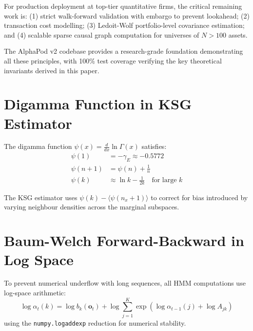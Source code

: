 \documentclass[12pt,a4paper]{article}
\newcommand{\bm}[1]{\boldsymbol{#1}}
\begin{document}
For production deployment at top-tier quantitative firms, the critical remaining
work is: (1) strict walk-forward validation with embargo to prevent lookahead;
(2) transaction cost modelling; (3) Ledoit-Wolf portfolio-level covariance
estimation; and (4) scalable sparse causal graph computation for universes of
$N > 100$ assets.

The AlphaPod v2 codebase provides a research-grade foundation demonstrating all
these principles, with 100\% test coverage verifying the key theoretical
invariants derived in this paper.




\appendix

\section{Digamma Function in KSG Estimator}

The digamma function $\psi(x) = \frac{d}{dx}\ln\Gamma(x)$ satisfies:
\begin{align}
    \psi(1) &= -\gamma_E \approx -0.5772 \\
    \psi(n+1) &= \psi(n) + \frac{1}{n} \\
    \psi(k) &\approx \ln k - \frac{1}{2k} \quad \text{for large } k
\end{align}

The KSG estimator uses $\psi(k) - \langle \psi(n_x+1) \rangle$ to
correct for bias introduced by varying neighbour densities across the marginal
subspaces.

\section{Baum-Welch Forward-Backward in Log Space}

To prevent numerical underflow with long sequences, all HMM computations use
log-space arithmetic:
\begin{equation}
    \log \alpha_t(k) = \log b_k(\bm{o}_t) + \log\!\sum_{j=1}^K \exp\!\left(\log \alpha_{t-1}(j) + \log A_{jk}\right)
\end{equation}
using the \texttt{numpy.logaddexp} reduction for numerical stability.
\end{document}
